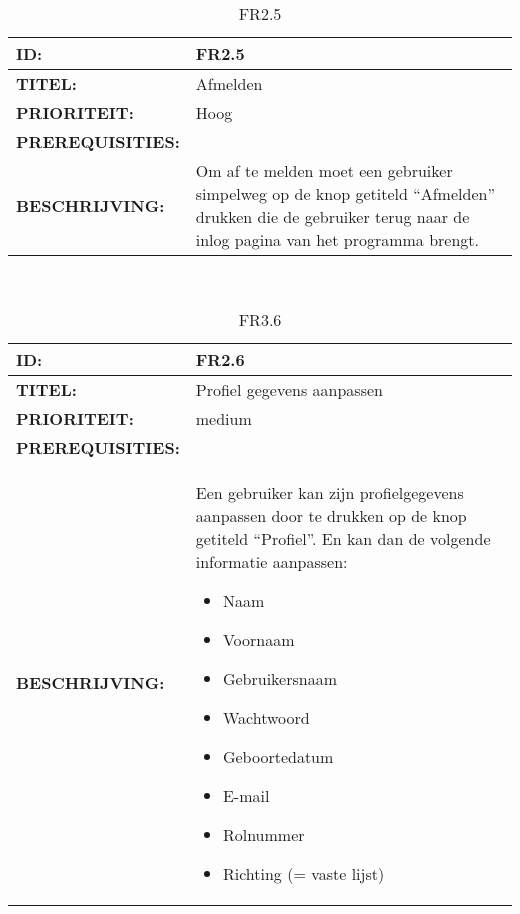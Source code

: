 \noindent\begin{table}[H]
            \begin{tabular}{l | p{10cm}}
                \textbf{ID:} & FR2.5 \\ \hline
                \textbf{TITEL:} & Afmelden\\ \hline
                \textbf{PRIORITEIT:} &  Hoog \\ \hline
                \textbf{PREREQUISITIES:} & \\ \hline
                \textbf{BESCHRIJVING:} & Om af te melden moet een gebruiker simpelweg op de knop getiteld “Afmelden” drukken die de gebruiker terug naar de inlog pagina van het programma brengt.\\
            \end{tabular}\\
            \caption{FR2.5}
            \label{tab:FR2.5}
        \end{table}


\noindent\begin{table}[H]
            \begin{tabular}{l | p{10cm}}
                \textbf{ID:} & FR2.6 \\ \hline
                \textbf{TITEL:} & Profiel gegevens aanpassen\\ \hline
                \textbf{PRIORITEIT:} &  medium \\ \hline
                \textbf{PREREQUISITIES:} & \\ \hline
                \textbf{BESCHRIJVING:} & Een gebruiker kan zijn profielgegevens aanpassen door te drukken op de knop getiteld “Profiel”. 
                                        En kan dan de volgende informatie aanpassen:
                                        \begin{itemize}\itemsep1pt \parskip0pt \parsep0pt
                                        \item Naam
                                        \item Voornaam
                                        \item Gebruikersnaam
                                        \item Wachtwoord
                                        \item Geboortedatum
                                        \item E-mail
                                        \item Rolnummer
                                        \item Richting (= vaste lijst)
                                        \end{itemize}\\
            \end{tabular}\\
            \caption{FR3.6}
            \label{tab:FR2.6}
        \end{table}



